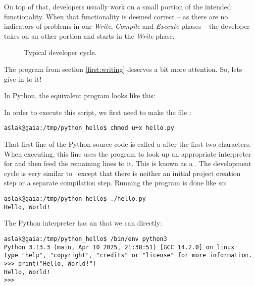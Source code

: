 On top of that, developers usually work on a small portion of the intended functionality. When that functionality is deemed correct -- as there are no indicators of problems in our \textsl{Write}, \textsl{Compile} and \textsl{Execute} phases -- the developer takes on an other portion and starts in the \textsl{Write} phase.

\begin{figure}[tbp]
  
  \caption{Typical developer cycle.}
  \label{fig:first:phases:cycle}
\end{figure}

\csharpsection{\csharp}

The program from section \ref{first:writing} deserves a bit more attention. So, lets give in to it!

\label{sec:first:python}

In Python, the equivalent program looks like this:


In order to execute this script, we first need to make the file :
\begin{verbatim}
aslak@gaia:/tmp/python_hello$ chmod u+x hello.py
\end{verbatim}

That first line of the Python source code is called a  after the first two characters. When executing, this line uses the  program to look up an appropriate interpreter for  and then feed the remaining lines to it. This is known as a . The development cycle is very similar to \csharp\ except that there is neither an initial project creation step or a separate compilation step. Running the program is done like so:

\begin{verbatim}
aslak@gaia:/tmp/python_hello$ ./hello.py
Hello, World!
\end{verbatim}

The Python interpreter has an  that we can  directly:

\begin{verbatim}
aslak@gaia:/tmp/python_hello$ /bin/env python3
Python 3.13.3 (main, Apr 10 2025, 21:38:51) [GCC 14.2.0] on linux
Type "help", "copyright", "credits" or "license" for more information.
>>> print("Hello, World!")
Hello, World!
>>> 
\end{verbatim}

